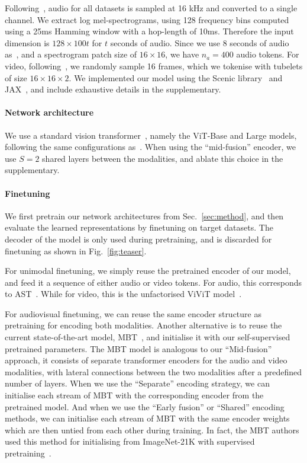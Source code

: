 \documentclass[10pt,twocolumn,letterpaper]{article}
\def \paravspace {-1\baselineskip}
\begin{document}
Following~\cite{gong2021ast, nagrani2021attention}, audio for all datasets is sampled at 16 kHz and converted to a single channel. We extract log mel-spectrograms, using 128 frequency bins computed using a 25ms Hamming window with a hop-length of 10ms.
Therefore the input dimension is $128 \times 100t$ for $t$ seconds of audio.
Since we use 8 seconds of audio as~\cite{nagrani2021attention}, and a spectrogram patch size of $16 \times 16$, we have $n_a = 400$ audio tokens. For video, following~\cite{tong2022videomae, feichtenhofer2022masked}, we randomly sample 16 frames, which we tokenise with tubelets of size $16 \times 16 \times 2$.
We implemented our model using the Scenic library~\cite{dehghani2021scenic} and JAX~\cite{jax2018github}, and include exhaustive details in the supplementary.

\vspace{\paravspace}
\paragraph{Network architecture}
We use a standard vision transformer~\cite{dosovitskiy_iclr_2021}, namely the ViT-Base and Large models, following the same configurations as~\cite{dosovitskiy_iclr_2021, devlin_naacl_2019}.
When using the ``mid-fusion'' encoder, we use $S = 2$ shared layers between the modalities, and ablate this choice in the supplementary.

\vspace{\paravspace}
\paragraph{Finetuning}
We first pretrain our network architectures from Sec.~\ref{sec:method}, and then evaluate the learned representations by finetuning on target datasets.
The decoder of the model is only used during pretraining, and is discarded for finetuning as shown in Fig.~\ref{fig:teaser}.


For unimodal finetuning, we simply reuse the pretrained encoder of our model, and feed it a sequence of either audio or video tokens.
For audio, this corresponds to AST~\cite{gong2021ast}.
While for video, this is the unfactorised ViViT model~\cite{arnab2021vivit}.

For audiovisual finetuning, we can reuse the same encoder structure as pretraining for encoding both modalities.
Another alternative is to reuse the current state-of-the-art model, MBT~\cite{nagrani2021attention}, and initialise it with our self-supervised pretrained parameters. The MBT model is analogous to our ``Mid-fusion'' approach, it consists of separate transformer encoders for the audio and video modalities, with lateral connections between the two modalities after a predefined number of layers.
When we use the ``Separate'' encoding strategy, we can initialise each stream of MBT with the corresponding encoder from the pretrained model.
And when we use the ``Early fusion'' or ``Shared'' encoding methods, we can initialise each stream of MBT with the same encoder weights which are then untied from each other during training.
In fact, the MBT authors used this method for initialising from ImageNet-21K with supervised pretraining~\cite{nagrani2021attention}.
\end{document}
